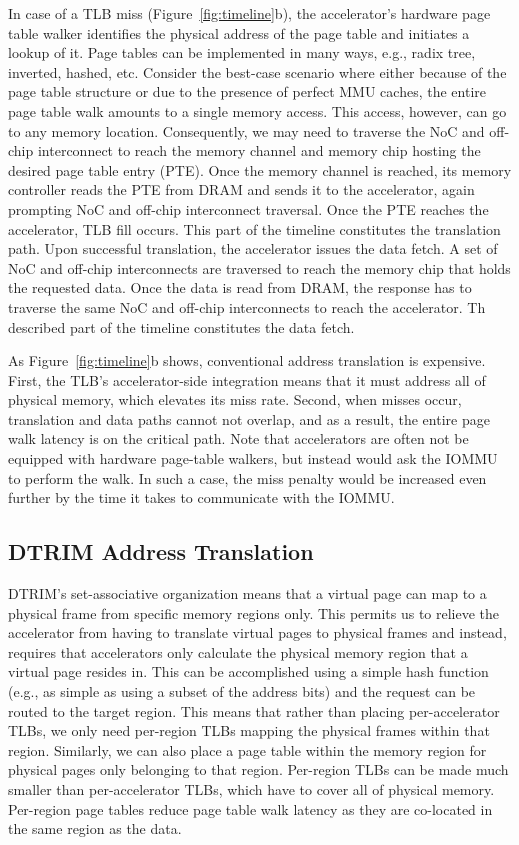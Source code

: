 In case of a TLB miss (Figure~\ref{fig:timeline}b),  the accelerator's hardware page table walker
identifies the physical address of the page table and initiates a
lookup of it. Page tables can be implemented in many ways, e.g., radix
tree, inverted, hashed, etc. Consider the best-case scenario where either
because of the page table structure or due to the presence of perfect MMU caches, the entire page
table walk amounts to a single memory access\cite{bhattacharjee:large-reach, barr:translation}. This access, however, can 
go to any memory location. Consequently, we may
need to traverse the NoC and off-chip interconnect to reach the
memory channel and memory chip hosting the desired page table entry (PTE). Once the memory
channel is reached, its memory controller reads the PTE from DRAM and sends it to the accelerator, again prompting NoC and
off-chip interconnect traversal. Once the PTE reaches the accelerator, TLB fill occurs. This part of the timeline
constitutes the translation path. Upon successful translation, the accelerator issues the data fetch. A set of NoC and off-chip
interconnects are traversed to reach the memory chip that holds
the requested data. Once the data is read from DRAM, the response has to traverse the same
NoC and off-chip interconnects to reach the accelerator. Th described part of the timeline constitutes the data fetch.

As Figure~\ref{fig:timeline}b shows, conventional address
translation is expensive. First, the TLB's accelerator-side
integration means that it must address all of physical memory, which
elevates its miss rate. Second, when misses occur,
translation and data paths cannot not overlap, and as a result, the entire page walk
latency is on the critical path. Note that accelerators are often not be equipped with hardware page-table walkers, but instead would
ask the IOMMU to perform the walk. In such a case, the miss penalty would be increased even further by the time it takes to communicate with the IOMMU.

\subsection{DTRIM Address Translation}
DTRIM's set-associative organization means that a virtual page can
map to a physical frame from specific memory regions only. This
permits us to relieve the accelerator from having to translate virtual
pages to physical frames and instead, requires that accelerators only
calculate the physical memory region that a virtual page resides in. 
This can be accomplished using a simple hash function (e.g., as simple as using
a subset of the address bits) and the request can be routed to the target region. This means that rather than
placing per-accelerator TLBs, we only need per-region TLBs mapping the
physical frames within that region. Similarly, we can also place a
page table within the memory region for physical pages only belonging
to that region. Per-region TLBs can be made much smaller than
per-accelerator TLBs, which have to cover all of physical
memory. Per-region page tables reduce page table walk latency as
they are co-located in the same region as the data.

